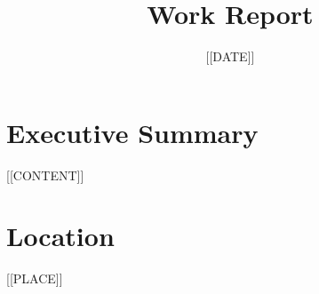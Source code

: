 \documentclass{report}
\title{Work Report}
\date{[[DATE]]}
\begin{document}
\maketitle

\section*{Executive Summary}
[[CONTENT]]

\section*{Location}
[[PLACE]]
\end{document}
